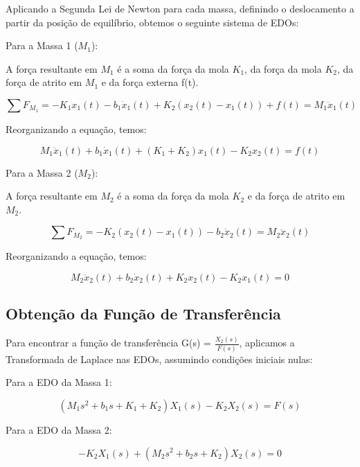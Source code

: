 \documentclass[9pt,a4paper,twocolumn,twoside]{tau-class/tau}
\begin{document}
Aplicando a Segunda Lei de Newton para cada massa, definindo o deslocamento a partir da posição de equilíbrio, obtemos o seguinte sistema de EDOs:

Para a Massa 1 ($M_1$):

A força resultante em $M_1$ é a soma da força da mola $K_1$, da força da mola $K_2$, da força de atrito em $M_1$ e da força externa f(t).

\begin{equation}
    \sum F_{M_1} = -K_1 x_1(t) - b_1 \dot x_1(t) + K_2(x_2(t) - x_1(t)) + f(t) = M_1 \ddot{x}_1(t)
\label{eq:SomaM1}
\end{equation}

Reorganizando a equação, temos:

\begin{equation}
    M_1 \ddot{x}_1(t) + b_1 \dot x_1(t) + (K_1 + K_2) x_1(t) - K_2x_2(t) = f(t)
\label{eq:Reorg}
\end{equation}

Para a Massa 2 ($M_2$):

A força resultante em $M_2$ é a soma da força da mola $K_2$ e da força de atrito em $M_2$.

\begin{equation}
    \sum F_{M_2} = -K_2(x_2(t) - x_1(t)) - b_2\dot{x}_2(t) = M_2 \ddot{x}_2(t)
    \label{eq:M2}
\end{equation}

Reorganizando a equação, temos:

\begin{equation}
    M_2 \ddot{x}_2(t) + b_2\dot{x}_2(t) + K_2 x_2(t) - K_2 x_1(t) =  0
    \label{M2reorg}
\end{equation}

\subsection{Obtenção da Função de Transferência}

Para encontrar a função de transferência G(s) = $\frac{X_2(s)}{F(s)}$, aplicamos a Transformada de Laplace nas EDOs, assumindo condições iniciais nulas:

Para a EDO da Massa 1:

\begin{equation}
    (M_1s^2 + b_1s + K_1 + K_2)X_1(s) - K_2X_2(s) = F(s)
    \label{eq:EDOM1}
\end{equation}

Para a EDO da Massa 2:

\begin{equation}
    -K_2X_1(s) + (M_2s^2 + b_2s + K_2)X_2(s) = 0
    \label{eq:EDOM2}
\end{equation}
\end{document}
